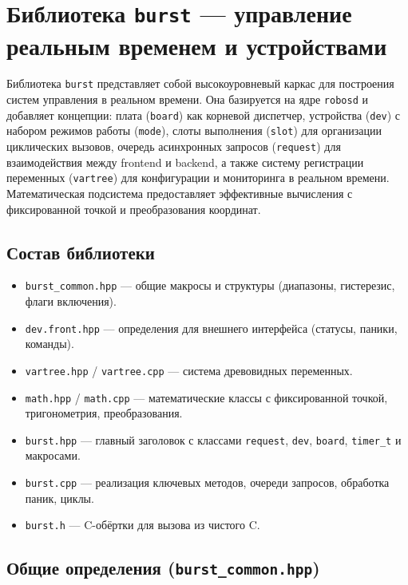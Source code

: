 \documentclass[a4paper,12pt]{article}
\begin{document}
\section{Библиотека \texttt{burst} — управление реальным временем и устройствами}

Библиотека \texttt{burst} представляет собой высокоуровневый каркас для построения систем управления в реальном времени. Она базируется на ядре \texttt{robosd} и добавляет концепции: плата (\texttt{board}) как корневой диспетчер, устройства (\texttt{dev}) с набором режимов работы (\texttt{mode}), слоты выполнения (\texttt{slot}) для организации циклических вызовов, очередь асинхронных запросов (\texttt{request}) для взаимодействия между frontend и backend, а также систему регистрации переменных (\texttt{vartree}) для конфигурации и мониторинга в реальном времени. Математическая подсистема предоставляет эффективные вычисления с фиксированной точкой и преобразования координат.

\subsection{Состав библиотеки}

\begin{itemize}
    \item \texttt{burst\_common.hpp} — общие макросы и структуры (диапазоны, гистерезис, флаги включения).
    \item \texttt{dev.front.hpp} — определения для внешнего интерфейса (статусы, паники, команды).
    \item \texttt{vartree.hpp} / \texttt{vartree.cpp} — система древовидных переменных.
    \item \texttt{math.hpp} / \texttt{math.cpp} — математические классы с фиксированной точкой, тригонометрия, преобразования.
    \item \texttt{burst.hpp} — главный заголовок с классами \texttt{request}, \texttt{dev}, \texttt{board}, \texttt{timer\_t} и макросами.
    \item \texttt{burst.cpp} — реализация ключевых методов, очереди запросов, обработка паник, циклы.
    \item \texttt{burst.h} — C-обёртки для вызова из чистого C.
\end{itemize}

\subsection{Общие определения (\texttt{burst\_common.hpp})}
\end{document}
